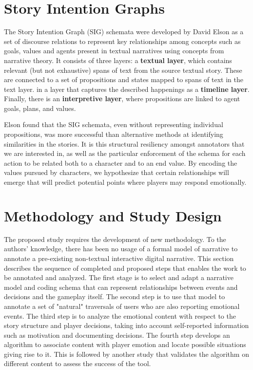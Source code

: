 \section{Story Intention Graphs}
\label{sec:orgheadline4}
The Story Intention Graph (SIG) schemata were developed by David Elson
as a set of discourse relations to represent key relationships among
concepts such as goals, values and agents present in textual
narratives using concepts from narrative theory. It consists of three
layers: a \textbf{textual layer}, which contains relevant (but not
exhaustive) spans of text from the source textual story. These are
connected to a set of propositions and states mapped to spans of text
in the text layer. in a layer that captures the described happenings
as a \textbf{timeline layer}. Finally, there is an \textbf{interpretive layer},
where propositions are linked to agent goals, plans, and values.

Elson found that the SIG schemata, even without representing
individual propositions, was more successful than alternative methods
at identifying similarities in the stories. It is this structural
resiliency amongst annotators that we are interested in, as well as
the particular enforcement of the schema for each action to be related
both to a character and to an end value. By encoding the values
pursued by characters, we hypothesize that certain relationships will
emerge that will predict potential points where players may respond
emotionally. 

\section{Methodology and Study Design}
\label{sec:orgheadline8}
The proposed study requires the development of new methodology. To the
authors' knowledge, there has been no usage of a formal model of
narrative to annotate a pre-existing non-textual interactive digital
narrative. This section describes the sequence of completed and
proposed steps that enables the work to be annotated and analyzed. The
first stage is to select and adapt a narrative model and coding schema
that can represent relationships between events and decisions and the
gameplay itself. The second step is to use that model to annotate a
set of "natural" traversals of users who are also reporting emotional
events. The third step is to analyze the emotional content with
respect to the story structure and player decisions, taking into
account self-reported information such as motivation and documenting
decisions. The fourth step develops an algorithm to associate content
with player emotion and locate possible situations giving rise to it.
This is followed by another study that validates the algorithm on
different content to assess the success of the tool.

